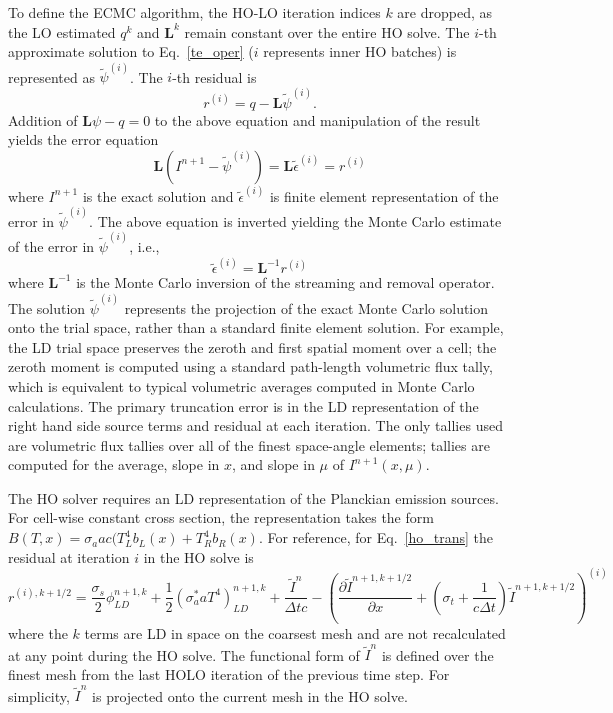 \documentclass{mc2013}
\newcommand{\pderiv}[2]{\frac{\partial #1}{\partial #2}}
\newcommand{\B}[1]{\ensuremath{\mathbf{#1}}}
\begin{document}
To define the ECMC algorithm, the HO-LO iteration indices
$k$ are dropped, as the LO estimated $q^{k}$ and $\B L^{k}$ remain constant over the entire HO solve.
The $i$-th approximate solution to Eq.~\eqref{te_oper} ($i$ represents inner HO
batches) is represented as
$\tilde{\psi}^{(i)}$.    
The $i$-th residual is 
\begin{equation}
r^{(i)} = q - \B L\tilde{\psi}^{(i)}.
\end{equation}
Addition of $\B L\psi - q=0$ to the above equation 
and manipulation of the result yields the error equation
\begin{equation}
    \B L (I^{n+1} - \tilde{\psi}^{(i)}) = \B L \tilde{\epsilon}^{(i)} = r^{(i)}
\end{equation}
where $I^{n+1}$ is the exact solution and $\tilde{\epsilon}^{(i)}$ is finite element
representation of the error in
$\tilde{\psi}^{(i)}$. The above equation is inverted yielding the Monte Carlo
estimate of the error in $\tilde{\psi}^{(i)}$, i.e.,
\begin{equation}
\tilde{\epsilon}^{(i)} = \B L^{-1} r^{(i)}
\end{equation}
where $\B L^{-1}$ is the Monte Carlo inversion of the streaming and removal operator.
The solution $\tilde{\psi}^{(i)}$ represents the projection of the exact Monte Carlo
solution onto the trial space, rather than a standard finite element solution.
For example, the LD trial space preserves the zeroth and first spatial moment over a
cell; the zeroth moment is computed using a standard path-length volumetric flux tally, which
is equivalent to typical volumetric averages computed in Monte Carlo calculations.  The primary truncation error is in the LD
representation of the right hand side source terms and residual at each
iteration.  The only tallies used are volumetric flux tallies over all of the finest space-angle
elements; tallies are computed for the average, slope in $x$, and slope in $\mu$ of
$I^{n+1}(x,\mu)$.  

The HO solver requires an LD representation of the Planckian emission sources.  For cell-wise constant cross section, the
representation takes the form $B(T,x) = \sigma_a a c (T_L^4 b_L(x) + T_R^4 b_R(x)$. 
For reference, for Eq.~\eqref{ho_trans} the residual at iteration $i$ in the HO solve
is
\begin{equation}
r^{(i),k+1/2} = \frac{\sigma_s}{2} \phi_{LD}^{n+1,k} +\frac{1}{2} \left(\sigma_a^* a T^4
\right)_{LD}^{n+1,k} + \frac{\tilde{I}^n}{\Delta t c} -
\left(\pderiv{\tilde{I}^{n+1,k+1/2}}{x} +
\left(\sigma_t + \frac{1}{c \Delta t }\right) \tilde{I}^{n+1,k+1/2}\right)^{(i)}
\end{equation}
where the $k$ terms are LD in space on the coarsest mesh and are not recalculated at any point during
the HO solve.  The functional form of $\tilde{I}^n$ is defined over the finest mesh from the last HOLO
iteration of the previous time step.  For simplicity, $\tilde I^n$ is projected onto the current mesh in the HO solve.
  
\end{document}
